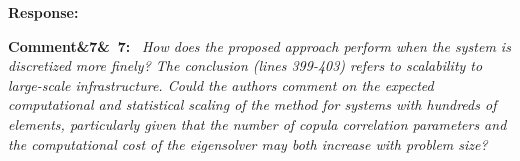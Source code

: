 \documentclass[11pt]{article}
\newenvironment{rcomment}[1]{\par\bigskip\noindent\textbf{Comment\ifx&#1&\else\ #1\fi:}\ \itshape}{\par}
\newenvironment{response}{\par\smallskip\noindent\color{resp}\textbf{Response:}\ }{\par}
\begin{document}
\begin{response}
\end{response}

\begin{rcomment}{7}
How does the proposed approach perform when the system is discretized more finely? The conclusion (lines 399-403)
refers to scalability to large-scale infrastructure. Could the authors comment on the expected computational and  statistical scaling of the method for systems with hundreds of elements, particularly given that the number of copula correlation parameters and the computational cost of the eigensolver may both increase with problem size?
\end{rcomment}
\end{document}
